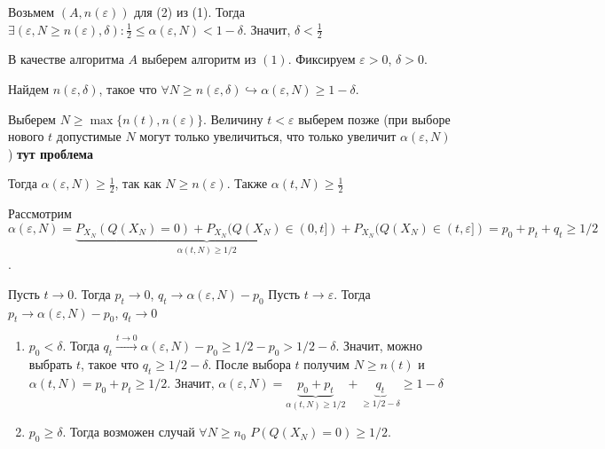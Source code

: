 \documentclass[a4paper]{article}
\def\eps{\varepsilon}
\begin{document}
\begin{enumerate}
Возьмем $(A,n(\eps))$ для (2) из (1). Тогда
$\exists(\eps,N\geqslant n(\eps),\delta)\colon \frac{1}{2}\leqslant\alpha(\eps, N)<1-\delta$. Значит, $\delta<\frac{1}{2}$

В качестве алгоритма $A$ выберем алгоритм из $(1)$. Фиксируем $\eps>0$, $\delta>0$.

Найдем $n(\eps,\delta)$, такое что $\forall N\geqslant n(\eps,\delta)\hookrightarrow\alpha(\eps, N)\geqslant 1-\delta$.

Выберем $N\geqslant \max\{n(t), n(\eps)\}$. Величину $t<\eps$ выберем позже (при выборе нового $t$ допустимые $N$ могут только увеличиться, что только увеличит $\alpha(\eps, N)$) {\bf тут проблема}

Тогда $\alpha(\eps, N)\geqslant\frac{1}{2}$, так как $N\geqslant n(\eps)$. Также $\alpha(t,N)\geqslant \frac{1}{2}$

Рассмотрим $\alpha(\eps, N)=\underbrace{P_{X_N}(Q(X_N)=0)+P_{X_N}(Q(X_N)\in(0,t])}_{\alpha(t,N)\geqslant1/2}+P_{X_N}(Q(X_N)\in(t,\eps])=p_0+p_t+q_t\geqslant 1/2$.

Пусть $t\to 0$. Тогда $p_t\to 0$, $q_t\to\alpha(\eps, N)-p_0$
Пусть $t\to\eps$. Тогда $p_t\to \alpha(\eps, N)-p_0$, $q_t\to 0$

\begin{enumerate}
\item $p_0<\delta$. Тогда $q_t\overset{t\to 0}{\longrightarrow}\alpha(\eps, N)-p_0\geqslant1/2-p_0>1/2-\delta$. Значит, можно выбрать $t$, такое что $q_t\geqslant 1/2-\delta$. После выбора $t$ получим $N\geqslant n(t)$ и $\alpha(t,N)=p_0+p_t\geqslant 1/2$. Значит, $\alpha(\eps, N)=\underbrace{p_0+p_t}_{\alpha(t,N)\geqslant 1/2}+\underbrace{q_t}_{\geqslant 1/2-\delta}\geqslant 1-\delta$
\item $p_0\geqslant\delta$. Тогда возможен случай $\forall N\geqslant n_0$ $P(Q(X_N)=0)\geqslant 1/2$. 
\end{enumerate}
\end{enumerate}
\end{document}
